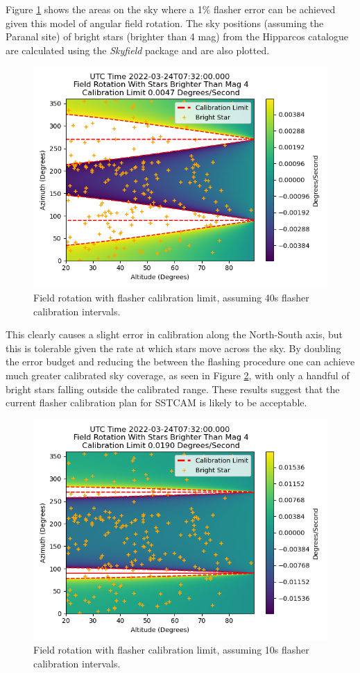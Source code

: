 Figure \ref{fig:rot40s} shows the areas on the sky where a 1\% flasher error can be achieved given this model of angular field rotation. The sky positions (assuming the Paranal site) of bright stars (brighter than 4 mag) from the Hipparcos catalogue are calculated using the \textit{Skyfield} package and are also plotted.
\begin{figure}[h]
\begin{centering}
\includegraphics[width=0.7\columnwidth]{./figures/rot40s.png}
\caption{Field rotation with flasher calibration limit, assuming 40s flasher calibration intervals.}
\label{fig:rot40s}
\end{centering}
\end{figure}

This clearly causes a slight error in calibration along the North-South axis, but this is tolerable given the rate at which stars move across the sky. By doubling the error budget and reducing the between the flashing procedure one can achieve much greater calibrated sky coverage, as seen in Figure \ref{fig:rot10s}, with only a handful of bright stars falling outside the calibrated range. These results suggest that the current flasher calibration plan for SSTCAM is likely to be acceptable.

\begin{figure}[h]
\begin{centering}
\includegraphics[width=0.7\columnwidth]{./figures/rot10s.png}
\caption{Field rotation with flasher calibration limit, assuming 10s flasher calibration intervals.}
\label{fig:rot10s}
\end{centering}
\end{figure}

